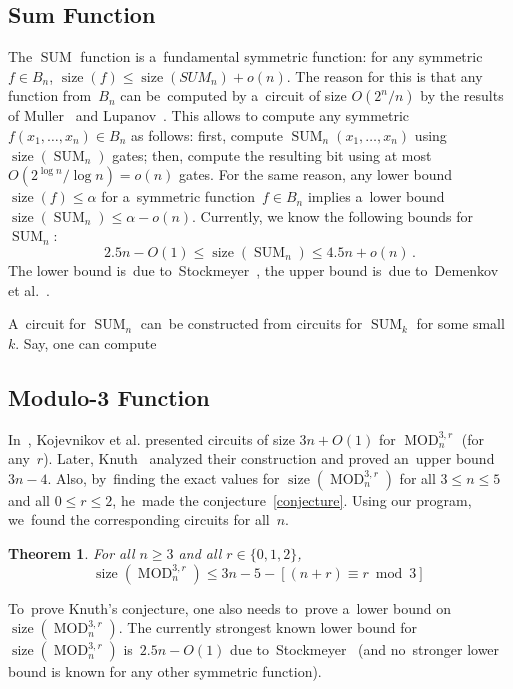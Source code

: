 \documentclass[12pt,letterpaper]{article}
\newtheorem{theorem}{Theorem}
\DeclareMathOperator{\SUM}{SUM}
\DeclareMathOperator{\MOD}{MOD}
\DeclareMathOperator{\size}{size}
\begin{document}
\subsection{Sum Function}
The $\SUM$ function is a~fundamental symmetric function: for any symmetric $f \in B_n$, $\size(f)\le \size(SUM_n)+o(n)$. The reason for this is that any function from~$B_n$ can be~computed by a~circuit of size $O(2^n/n)$ by the results of Muller~\cite{M56} and Lupanov~\cite{Lup59}. This allows to compute any symmetric $f(x_1, \dotsc, x_n) \in B_n$ as follows: first, compute $\SUM_n(x_1, \dotsc, x_n)$ using $\size(\SUM_n)$ gates; then, compute the resulting bit using at most $O(2^{\log n}/\log n)=o(n)$ gates. For the same reason, any lower bound $\size(f) \le \alpha$ for
a~symmetric function~$f \in B_n$ implies a~lower bound $\size(\SUM_n) \le \alpha-o(n)$. Currently, we know the following bounds for $\SUM_n$:
\[2.5n-O(1) \le \size(\SUM_n) \le 4.5n+o(n) \, .\]
The lower bound is~due to~Stockmeyer~\cite{DBLP:journals/mst/Stockmeyer77}, the upper bound is~due to~Demenkov et al.~\cite{DBLP:journals/ipl/DemenkovKKY10}.

A~circuit for $\SUM_n$ can~be constructed from circuits for $\SUM_k$ for some small~$k$. Say, one can compute


\subsection{Modulo-3 Function}
In~\cite{DBLP:conf/sat/KojevnikovKY09}, Kojevnikov et al. 
presented circuits of size $3n+O(1)$ for $\MOD_n^{3,r}$ (for any~$r$). Later, 
Knuth~\cite[solution to exercise~$480$]{Knuth:2015:ACP:2898950} analyzed their construction and proved an~upper 
bound $3n-4$. Also, by~finding the exact values 
for $\size(\MOD_n^{3,r})$ for all $3 \le n \le 5$ and all $0 \le r \le 2$, he~made the conjecture~\eqref{conjecture}.
Using our program, we~found the corresponding circuits for all~$n$.

\begin{theorem}\label{theorem:mod3upper}
For all $n \ge 3$ and all $r \in \{0,1,2\}$,
\[\size(\MOD_n^{3,r}) \le 3n-5-[(n+r) \equiv r\bmod 3] \, \]
\end{theorem}

To~prove Knuth's conjecture, one also needs to~prove a~lower bound on $\size(\MOD_n^{3,r})$. The currently strongest known lower bound for $\size(\MOD_n^{3,r})$ 
is~$2.5n-O(1)$ due to~Stockmeyer~\cite{DBLP:journals/mst/Stockmeyer77} 
(and no~stronger lower bound is known for any other symmetric function).
\end{document}
